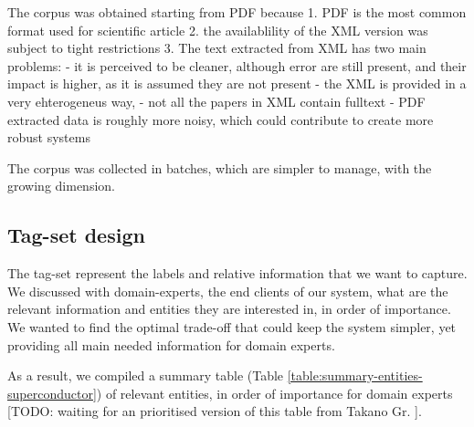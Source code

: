 \documentclass[a4paper,10pt]{article}
\begin{document}
The corpus was obtained starting from PDF because 
1. PDF is the most common format used for scientific article
2. the availablility of the XML version was subject to tight restrictions 
3. The text extracted from XML has two main problems: 
 - it is perceived to be cleaner, although error are still present, and their impact is higher, as it is assumed they are not present 
 - the XML is provided in a very ehterogeneus way, 
 - not all the papers in XML contain fulltext 
 - PDF extracted data is roughly more noisy, which could contribute to create more robust systems 

The corpus was collected in batches, which are simpler to manage, with the growing dimension. 

\subsection{Tag-set design}
The tag-set represent the labels and relative information that we want to capture. We discussed with domain-experts, the end clients of our system, what are the relevant information and entities they are interested in, in order of importance. We wanted to find the optimal trade-off that could keep the system simpler, yet providing all main needed information for domain experts. 

As a result, we compiled a summary table (Table \ref{table:summary-entities-superconductor}) of relevant entities, in order of importance for domain experts [TODO: waiting for an prioritised version of this table from Takano Gr. ].
\end{document}
